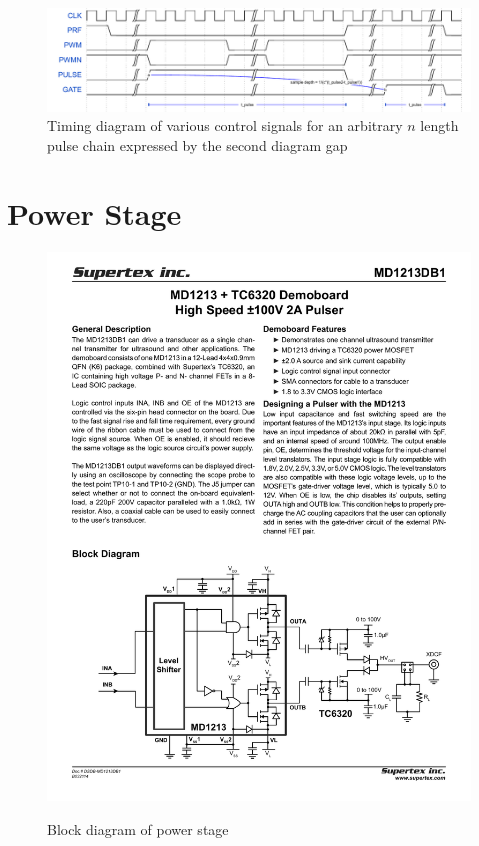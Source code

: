 \begin{figure}[htbp]
	\centering
	\includegraphics[width=\textwidth]{Figures/3_wavedrom.pdf}
	\caption{Timing diagram of various control signals for an arbitrary $n$ length pulse chain expressed by the second diagram gap}
	\label{fig:3_pulse_timing_diagram}
\end{figure}

\section{Power Stage}
\begin{figure}[htbp]
	\centering
	\includegraphics[width=\textwidth]{Figures/3_power_stage_block.pdf}
	\label{fig:3_power_stage}
	\caption{Block diagram of power stage \cite{MD1213DB1}}
\end{figure}
